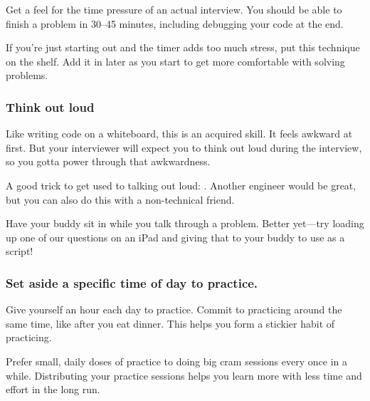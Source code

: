 \documentclass{article}
\begin{document}
Get a feel for the time pressure of an actual interview. You should be able to finish a problem in 30–45 minutes, including debugging your code at the end.

If you’re just starting out and the timer adds too much stress, put this technique on the shelf. Add it in later as you start to get more comfortable with solving problems.



\subsubsection{Think out loud}

Like writing code on a whiteboard, this is an acquired skill. It feels awkward at first. But your interviewer will expect you to think out loud during the interview, so you gotta power through that awkwardness.

A good trick to get used to talking out loud: . Another engineer would be great, but you can also do this with a non-technical friend.

Have your buddy sit in while you talk through a problem. Better yet—try loading up one of our questions on an iPad and giving that to your buddy to use as a script!


\subsubsection{Set aside a specific time of day to practice.}

Give yourself an hour each day to practice. Commit to practicing around the same time, like after you eat dinner. This helps you form a stickier habit of practicing.

Prefer small, daily doses of practice to doing big cram sessions every once in a while. Distributing your practice sessions helps you learn more with less time and effort in the long run.
\end{document}
